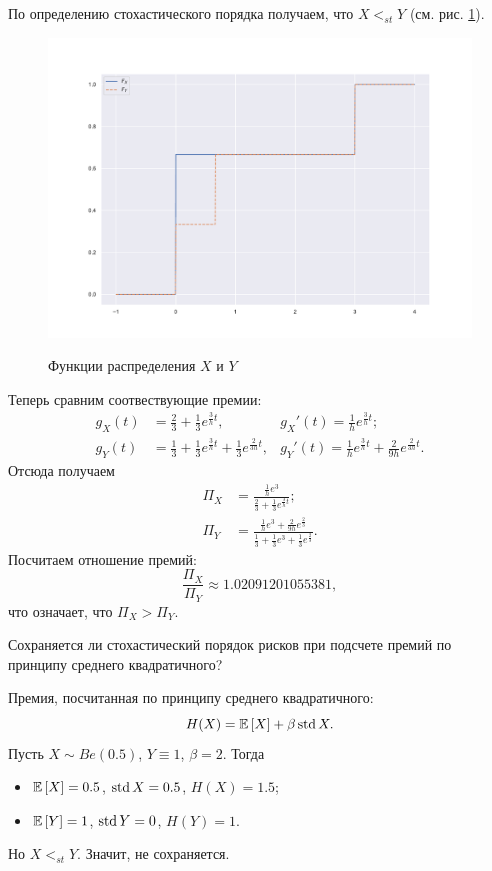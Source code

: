     По определению стохастического порядка получаем, что $X <_{st} Y$ (см. рис. \ref{hw07:task1pic1}).
    \begin{figure}[htbp]
        \includegraphics[width=\textwidth]{pics/hw7t1p1.pdf}\label{hw07:task1pic1}
        \caption{Функции распределения $X$ и $Y$}
    \end{figure}
    Теперь сравним соотвествующие премии:
    \begin{align}
        g_X(t) &= \frac{2}{3}+\frac{1}{3}e^{\frac{3}{h}t},  & g_X'(t) = \frac{1}{h}e^{\frac{3}{h}t};\\
        g_Y(t) &= \frac{1}{3}+\frac{1}{3}e^{\frac{3}{h}t} +\frac{1}{3}e^{\frac{2}{3h}t}, & g_Y'(t)=\frac{1}{h}e^{\frac{3}{h}t} +\frac{2}{9h}e^{\frac{2}{3h}t}.
    \end{align}
    Отсюда получаем
    \begin{align}
        \Pi_X &= \frac{\frac{1}{h}e^{3}}{\frac{2}{3}+\frac{1}{3}e^{\frac{3}{h}t}};\\
        \Pi_Y &= \frac{\frac{1}{h}e^{3} +\frac{2}{9h}e^{\frac{2}{3}}}{\frac{1}{3}+\frac{1}{3}e^{3} +\frac{1}{3}e^{\frac{2}{3}}}.
    \end{align}
    Посчитаем отношение премий:
    \begin{equation}
        \frac{\Pi_X}{\Pi_Y} \approx 1.02091201055381,
    \end{equation}
    что означает, что $\Pi_X > \Pi_Y$.


\problem{} Сохраняется ли стохастический порядок рисков при подсчете премий по принципу среднего квадратичного?

\solution{}
    Премия, посчитанная по принципу среднего квадратичного:
    \begin{equation}
        H(X) = \mathbb{E}\left[X\right] + \beta \operatorname*{std} X.
    \end{equation}
    Пусть $X\sim Be(0.5)$, $Y\equiv 1$, $\beta = 2$. Тогда
    \begin{itemize}
        \item $\mathbb{E}\left[X\right] = 0.5$, $\operatorname*{std} X = 0.5$, $H(X) = 1.5$;
        \item $\mathbb{E}\left[Y\right] = 1$, $\operatorname*{std} Y = 0$, $H(Y) = 1$. 
    \end{itemize}
    Но $X<_{st}Y$. Значит, не сохраняется.

